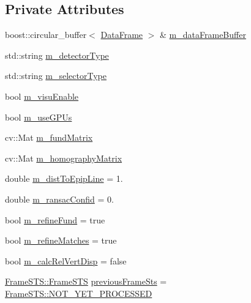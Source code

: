 \subsection*{Private Attributes}
\begin{DoxyCompactItemize}
\item 
boost\+::circular\+\_\+buffer$<$ \hyperlink{structDataFrame}{Data\+Frame} $>$ \& \hyperlink{classKeypointProcessorGpu_a2630dc84058b86cf55b451457223636c}{m\+\_\+data\+Frame\+Buffer}
\item 
std\+::string \hyperlink{classKeypointProcessorGpu_acc2e8a31a5b2f2e6e4bb491770631935}{m\+\_\+detector\+Type}
\item 
std\+::string \hyperlink{classKeypointProcessorGpu_a5f611760beb6ba345fac1eaaccdc3cbe}{m\+\_\+selector\+Type}
\item 
bool \hyperlink{classKeypointProcessorGpu_a31a0d88cbd1aec736eb30e97413b9247}{m\+\_\+visu\+Enable}
\item 
bool \hyperlink{classKeypointProcessorGpu_a9d5efa15a005d4a2e4c388fa985b93e4}{m\+\_\+use\+G\+P\+Us}
\item 
cv\+::\+Mat \hyperlink{classKeypointProcessorGpu_a2c3270837954025c6dd795cba7ff98f4}{m\+\_\+fund\+Matrix}
\item 
cv\+::\+Mat \hyperlink{classKeypointProcessorGpu_a7e08f5f64a286910479ec783ed42c810}{m\+\_\+homography\+Matrix}
\item 
double \hyperlink{classKeypointProcessorGpu_ae37e6c6a36df9bd6fa3eb8ab0f19e7ee}{m\+\_\+dist\+To\+Epip\+Line} = 1.
\item 
double \hyperlink{classKeypointProcessorGpu_ab610f6f103d888b7c554327a76d58de8}{m\+\_\+ransac\+Confid} = 0.
\item 
bool \hyperlink{classKeypointProcessorGpu_ab62f73737e0d61bfc188b23ef4311b63}{m\+\_\+refine\+Fund} = true
\item 
bool \hyperlink{classKeypointProcessorGpu_a4d74380d0d8a32d06ceb61787c3fb7c5}{m\+\_\+refine\+Matches} = true
\item 
bool \hyperlink{classKeypointProcessorGpu_a042507c38ba05d0987aef504de3b4542}{m\+\_\+calc\+Rel\+Vert\+Disp} = false
\item 
\hyperlink{namespaceFrameSTS_aa00e1583f3bc837ad3fbfb9beaaa0692}{Frame\+S\+T\+S\+::\+Frame\+S\+TS} \hyperlink{classKeypointProcessorGpu_a298b81730df9cce6b59b0fc35ba1c865}{previous\+Frame\+Sts} = \hyperlink{namespaceFrameSTS_aa00e1583f3bc837ad3fbfb9beaaa0692a8320d47ecf7adbfb6dedd682bf1820db}{Frame\+S\+T\+S\+::\+N\+O\+T\+\_\+\+Y\+E\+T\+\_\+\+P\+R\+O\+C\+E\+S\+S\+ED}
\end{DoxyCompactItemize}


